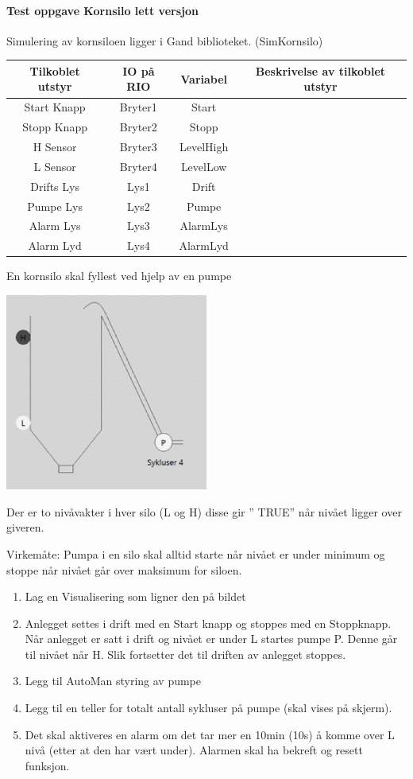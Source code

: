 



\paragraph{Test oppgave Kornsilo lett versjon}

Simulering av kornsiloen ligger i Gand biblioteket. (SimKornsilo)

\begin{tabular}{|c|c|c|c|}
\hline 
Tilkoblet utstyr & IO på RIO & Variabel & Beskrivelse av tilkoblet utstyr\tabularnewline
\hline 
\hline 
Start Knapp & Bryter1 & Start & \tabularnewline
\hline 
Stopp Knapp & Bryter2 & Stopp & \tabularnewline
\hline 
H Sensor & Bryter3 & LevelHigh & \tabularnewline
\hline 
L Sensor & Bryter4 & LevelLow & \tabularnewline
\hline 
Drifts Lys & Lys1 & Drift & \tabularnewline
\hline 
Pumpe Lys & Lys2 & Pumpe & \tabularnewline
\hline 
Alarm Lys & Lys3 & AlarmLys & \tabularnewline
\hline 
Alarm Lyd & Lys4 & AlarmLyd & \tabularnewline
\hline 
\end{tabular}

En kornsilo skal fyllest ved hjelp av en pumpe

\includegraphics[width=0.5\textwidth]{i08012x01.png}

Der er to nivåvakter i hver silo (L og H) disse gir \textquotedblright{}
TRUE\textquotedblright{} når nivået ligger over giveren.

Virkemåte: Pumpa i en silo skal alltid starte når nivået er under
minimum og stoppe når nivået går over maksimum for siloen.
\begin{enumerate}
\item Lag en Visualisering som ligner den på bildet
\item Anlegget settes i drift med en Start knapp og stoppes med en Stoppknapp.
Når anlegget er satt i drift og nivået er under L startes pumpe P.
Denne går til nivået når H. Slik fortsetter det til driften av anlegget
stoppes.
\item Legg til AutoMan styring av pumpe
\item Legg til en teller for totalt antall sykluser på pumpe (skal vises
på skjerm). 
\item Det skal aktiveres en alarm om det tar mer en 10min (10s) å komme
over L nivå (etter at den har vært under). Alarmen skal ha bekreft
og resett funksjon.
\end{enumerate}

